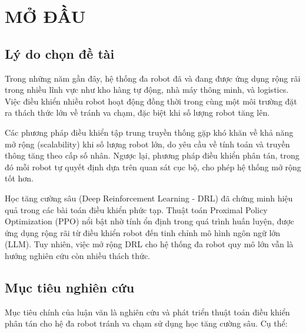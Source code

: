 
\chapter{MỞ ĐẦU}
\label{chap:introduction}


\section{Lý do chọn đề tài}
\label{sec:motivation}

Trong những năm gần đây, hệ thống đa robot đã và đang được ứng dụng rộng rãi trong nhiều lĩnh vực như kho hàng tự động, nhà máy thông minh, và logistics. Việc điều khiển nhiều robot hoạt động đồng thời trong cùng một môi trường đặt ra thách thức lớn về tránh va chạm, đặc biệt khi số lượng robot tăng lên.

Các phương pháp điều khiển tập trung truyền thống gặp khó khăn về khả năng mở rộng (scalability) khi số lượng robot lớn, do yêu cầu về tính toán và truyền thông tăng theo cấp số nhân. Ngược lại, phương pháp điều khiển phân tán, trong đó mỗi robot tự quyết định dựa trên quan sát cục bộ, cho phép hệ thống mở rộng tốt hơn.

Học tăng cường sâu (Deep Reinforcement Learning - DRL) đã chứng minh hiệu quả trong các bài toán điều khiển phức tạp. Thuật toán Proximal Policy Optimization (PPO) nổi bật nhờ tính ổn định trong quá trình huấn luyện, được ứng dụng rộng rãi từ điều khiển robot đến tinh chỉnh mô hình ngôn ngữ lớn (LLM). Tuy nhiên, việc mở rộng DRL cho hệ thống đa robot quy mô lớn vẫn là hướng nghiên cứu còn nhiều thách thức.


\section{Mục tiêu nghiên cứu}
\label{sec:objectives}

Mục tiêu chính của luận văn là nghiên cứu và phát triển thuật toán điều khiển phân tán cho hệ đa robot tránh va chạm sử dụng học tăng cường sâu. Cụ thể:

